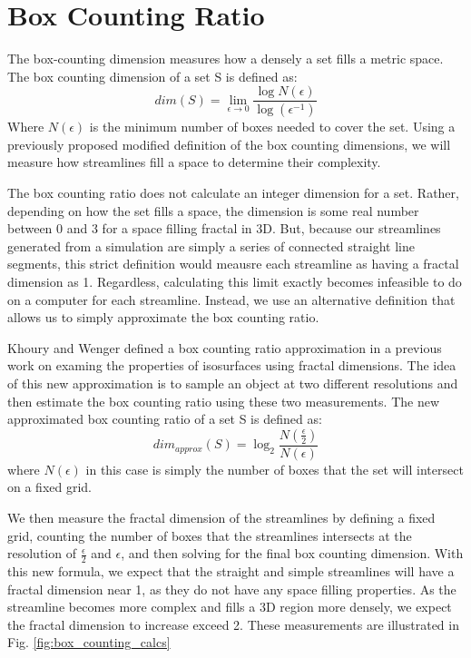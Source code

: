 \documentclass{egpubl}
\begin{document}
\section{Box Counting Ratio} \label{sec:bcr}

The box-counting dimension measures how a densely a set fills a metric space.
The box counting dimension of a set S is defined as:
\begin{equation} dim(S) = \lim_{\epsilon \to 0}  \frac{\log N(\epsilon)}{\log(\epsilon^{-1})}\end{equation}
Where $N(\epsilon)$ is the minimum number of boxes needed to cover the set.
Using a previously proposed modified definition of the box counting dimensions, we will measure how streamlines fill a space to determine their complexity.

The box counting ratio does not calculate an integer dimension for a set.
Rather, depending on how the set fills a space, the dimension is some real number between 0 and 3 for a space filling fractal in 3D.
But, because our streamlines generated from a simulation are simply a series of connected straight line segments, this strict definition would meausre each streamline as having a fractal dimension as 1.
Regardless, calculating this limit exactly becomes infeasible to do on a computer for each streamline.
Instead, we use an alternative definition that allows us to simply approximate the box counting ratio.

Khoury and Wenger \cite{khoury} defined a box counting ratio approximation in a previous work on examing the properties of isosurfaces using fractal dimensions.
The idea of this new approximation is to sample an object at two different resolutions and then estimate the box counting ratio using these two measurements.
The new approximated box counting ratio of a set S is defined as:
\begin{equation} dim_{approx}(S) = \log_2\frac{N(\frac{\epsilon}{2})}{N(\epsilon)}\end{equation}
where $N(\epsilon)$ in this case is simply the number of boxes that the set will intersect on a fixed grid.

We then measure the fractal dimension of the streamlines by defining a fixed grid, counting the number of boxes that the streamlines intersects at the resolution of $\frac{\epsilon}{2}$ and ${\epsilon}$, and then solving for the final box counting dimension.
With this new formula, we expect that the straight and simple streamlines will have a fractal dimension near 1, as they do not have any space filling properties.
As the streamline becomes more complex and fills a 3D region more densely, we expect the fractal dimension to increase exceed 2.
These measurements are illustrated in Fig. \ref{fig:box_counting_calcs}
\end{document}
